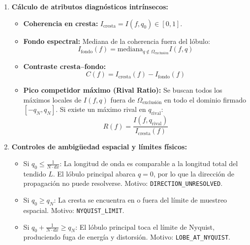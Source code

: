 \documentclass[11pt,a4paper]{article}
\begin{document}
\begin{enumerate}
    \item \textbf{Cálculo de atributos diagnósticos intrínsecos:}
    \begin{itemize}
        \item \textbf{Coherencia en cresta:} $I_{\text{cresta}} = I(f, q_0) \in [0, 1]$.
        \item \textbf{Fondo espectral:} Mediana de la coherencia fuera del lóbulo:
        \begin{equation}
            I_{\text{fondo}}(f) = \text{mediana}_{q \notin \Omega_{\text{exclusión}}} I(f, q)
        \end{equation}
        \item \textbf{Contraste cresta--fondo:}
        \begin{equation}
            C(f) = I_{\text{cresta}}(f) - I_{\text{fondo}}(f)
        \end{equation}
        \item \textbf{Pico competidor máximo (Rival Ratio):}
        Se buscan todos los máximos locales de $I(f, q)$ fuera de $\Omega_{\text{exclusión}}$ en todo el dominio firmado $[-q_N, q_N]$. Si existe un máximo rival en $q_{\text{rival}}$:
        \begin{equation}
            R(f) = \frac{I(f, q_{\text{rival}})}{I_{\text{cresta}}(f)}
        \end{equation}
    \end{itemize}

    \item \textbf{Controles de ambigüedad espacial y límites físicos:}
    \begin{itemize}
        \item Si $q_0 \le \frac{1}{N \cdot dx}$: La longitud de onda es comparable a la longitud total del tendido $L$. El lóbulo principal abarca $q=0$, por lo que la dirección de propagación no puede resolverse. Motivo: \texttt{DIRECTION\_UNRESOLVED}.
        \item Si $q_0 \ge q_N$: La cresta se encuentra en o fuera del límite de muestreo espacial. Motivo: \texttt{NYQUIST\_LIMIT}.
        \item Si $q_0 + \frac{1}{N \cdot dx} \ge q_N$: El lóbulo principal toca el límite de Nyquist, produciendo fuga de energía y distorsión. Motivo: \texttt{LOBE\_AT\_NYQUIST}.
    \end{itemize}
\end{enumerate}

\newpage
\end{document}
